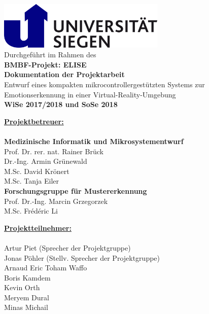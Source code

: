 
\begin{center}

\thispagestyle{empty}

	\includegraphics[width=8cm]{Images/uni-siegen-logo.png}
	\\
	\vspace*{1cm}
	\Large{Durchgef{\"u}hrt im Rahmen des}\\
	\Huge{\textbf{BMBF-Projekt: ELISE}}\\
	\vspace{1.0cm}
	\Huge{\textbf{Dokumentation der Projektarbeit}}\\
	\vspace{0.3cm}	
	\Large{Entwurf eines kompakten mikrocontrollergest{\"u}tzten Systems zur Emotionserkennung in einer Virtual-Reality-Umgebung}\\
\vspace{0.5cm}	
\Large{\textbf{WiSe 2017/2018 und SoSe 2018}}\\
\vspace{0.6cm}
\end{center}
	
\Large
\noindent
\underline{\textbf{Projektbetreuer:}}\\
\\
\noindent
\textbf{Medizinische Informatik und Mikrosystementwurf}\\
Prof. Dr. rer. nat. Rainer Br{\"u}ck\\
Dr.-Ing. Armin Gr{\"u}newald\\
M.Sc. David Kr{\"o}nert\\
M.Sc. Tanja Eiler\\

\noindent
\textbf{Forschungsgruppe f{\"u}r Mustererkennung}\\
Prof. Dr.-Ing. Marcin Grzegorzek\\
M.Sc. Frédéric Li\\
\vspace*{1.2cm}

\noindent
\underline{\textbf{Projektteilnehmer:}}\\
\\
\noindent
Artur Piet (Sprecher der Projektgruppe)\\
Jonas P{\"o}hler (Stellv. Sprecher der Projektgruppe)\\
Arnaud Eric Toham Waffo\\
Boris Kamdem\\
Kevin Orth\\
Meryem Dural\\
Minas Michail\\